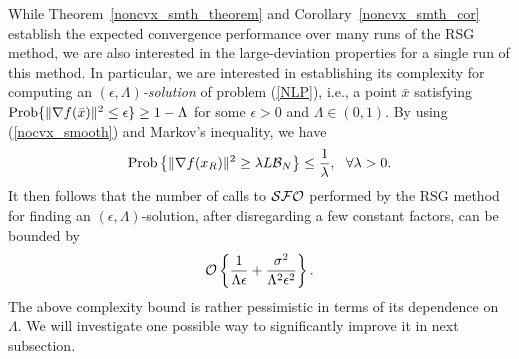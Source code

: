\documentclass[final]{siamltex}
\newcommand{\beq}{\begin{equation}}
\newcommand{\eeq}{\end{equation}}
\def\eqnok#1{(\ref{#1})}
\def\vgap{\vspace*{.1in}}
\def\prob{{\rm Prob}}
\def\prob{\mathop{\rm Prob}}
\def\SFO{{\cal SFO}}
\def\cB{{\cal B}}
\begin{document}


\vgap

While Theorem~\ref{noncvx_smth_theorem}
and Corollary~\ref{noncvx_smth_cor} establish the expected convergence
performance over many runs of the RSG method, we are also interested
in the large-deviation properties for a single run of this method. In particular,
we are interested in establishing its complexity for computing
an {\sl $(\epsilon, \Lambda)$-solution}
of problem \eqnok{NLP}, i.e., a point $\bar x$ satisfying
$\prob\{\|\nabla f(\bar x)\|^2 \le \epsilon\} \ge 1 - \Lambda$
for some $\epsilon >0$ and $\Lambda \in (0,1)$.
%
By using \eqnok{nocvx_smooth} and Markov's inequality, we have
\beq \label{nocvx_smooth_prob}
\prob\left\{
\|\nabla f(x_R)\|^2 \ge  \lambda L \cB_N \right\}
\le \frac{1}{\lambda}, \ \ \forall \lambda > 0.
\eeq
It then follows that the number of
calls to $\SFO$ performed by the RSG method for finding
an $(\epsilon, \Lambda)$-solution, after disregarding a few constant factors,
can be bounded by
\beq \label{nocvx_smooth_prob1}
{\cal O} \left\{
\frac{1}{\Lambda \epsilon} +  \frac{\sigma^2}{\Lambda^2 \epsilon^2} \right\}.
\eeq
The above complexity bound is rather pessimistic in terms of its dependence on $\Lambda$.
We will investigate one possible way to significantly improve it in next subsection.
\end{document}
